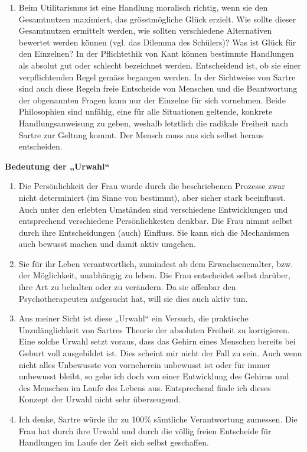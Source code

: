 \documentclass[12pt, letterpaper, twoside]{article}
\begin{document}
\begin{flushleft}
\begin{enumerate}[label=\alph*)]
\item
Beim Utilitarismus ist eine Handlung moralisch richtig, wenn sie den Gesamtnutzen maximiert,
das grösstmögliche Glück erzielt. Wie sollte dieser Gesamtnutzen ermittelt werden,
wie sollten verschiedene Alternativen bewertet werden können (vgl. das Dilemma des Schülers)? Was ist Glück für den Einzelnen?
In der Pflichtethik von Kant können bestimmte Handlungen als absolut gut oder schlecht bezeichnet werden. Entscheidend ist, ob sie einer verpflichtenden Regel gemäss begangen werden.
In der Sichtweise von Sartre sind auch diese Regeln freie Entscheide von Menschen und die Beantwortung der
obgenannten Fragen kann nur der Einzelne für sich vornehmen. Beide Philosophien sind unfähig,
eine für alle Situationen geltende, konkrete Handlungsanweisung zu geben, weshalb letztlich die radikale Freiheit nach Sartre zur Geltung kommt. Der Mensch muss aus sich selbst heraus entscheiden.

\end{enumerate}

\hfill

\textbf{Bedeutung der „Urwahl“}

\hfill

\begin{enumerate}[label=\alph*)]

\item
Die Persönlichkeit der Frau wurde durch die beschriebenen Prozesse zwar nicht determiniert (im Sinne von bestimmt),
aber sicher stark beeinflusst. Auch unter den erlebten Umständen sind verschiedene Entwicklungen und entsprechend
verschiedene Persönlichkeiten denkbar. Die Frau nimmt selbst durch ihre Entscheidungen (auch) Einfluss.
Sie kann sich die Mechanismen auch bewusst machen und damit aktiv umgehen.

\item
Sie für ihr Leben verantwortlich, zumindest ab dem Erwachsenenalter, bzw. der Möglichkeit,
unabhängig zu leben. Die Frau entscheidet selbst darüber, ihre Art zu behalten oder zu verändern.
Da sie offenbar den Psychotherapeuten aufgesucht hat, will sie dies auch aktiv tun.

\item
Aus meiner Sicht ist diese „Urwahl“ ein Versuch, die praktische Unzulänglichkeit
von Sartres Theorie der absoluten Freiheit zu korrigieren. Eine solche Urwahl setzt voraus,
dass das Gehirn eines Menschen bereits bei Geburt voll ausgebildet ist. Dies scheint mir nicht
der Fall zu sein. Auch wenn nicht alles Unbewusste von vorneherein unbewusst ist oder für immer
unbewusst bleibt, so gehe ich doch von einer Entwicklung des Gehirns und des Menschen im Laufe des Lebens aus.
Entsprechend finde ich dieses Konzept der Urwahl nicht sehr überzeugend.

\item
Ich denke, Sartre würde ihr zu 100\% sämtliche Verantwortung zumessen. Die Frau hat durch ihre Urwahl und
durch die völlig freien Entscheide für Handlungen im Laufe der Zeit sich selbst geschaffen.

\end{enumerate}
\end{flushleft}
\end{document}
